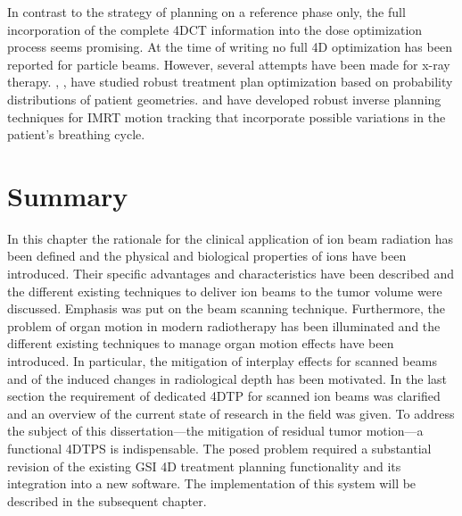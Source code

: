 In contrast to the strategy of planning on a reference phase only, the
full incorporation of the complete \ac{4DCT} information into the dose
optimization process seems promising.  At the time of writing
no full \ac{4D} optimization has been reported for particle beams.
However, several attempts have been made for x-ray
therapy. \citet{Unkelbach2009}, \eg, have studied robust treatment plan
optimization based on probability distributions of patient
geometries. \citet{Suh2009} and \citet{Nohadani2010} have developed
robust inverse planning techniques for \ac{IMRT} motion tracking that
incorporate possible variations in the patient's breathing cycle.

\section{Summary}
In this chapter the rationale for the clinical application of ion beam
radiation has been defined and the physical and biological properties
of ions have been introduced. Their specific advantages and
characteristics have been described and the different existing
techniques to deliver ion beams to the tumor volume were discussed.
Emphasis was put on the beam scanning technique. Furthermore, the
problem of organ motion in modern radiotherapy has been illuminated
and the different existing techniques to manage organ motion effects
have been introduced. In particular, the mitigation of interplay
effects for scanned beams and of the induced changes in radiological
depth has been motivated. In the last section the requirement of
dedicated \ac{4DTP} for scanned ion beams was clarified and an
overview of the current state of research in the field was given. To
address the subject of this dissertation---the mitigation of residual
tumor motion---a functional \ac{4DTPS} is indispensable. The posed
problem required a substantial revision of the existing \ac{GSI}
\ac{4D} treatment planning functionality and its integration into a
new software. The implementation of this system will be described in
the subsequent chapter.

